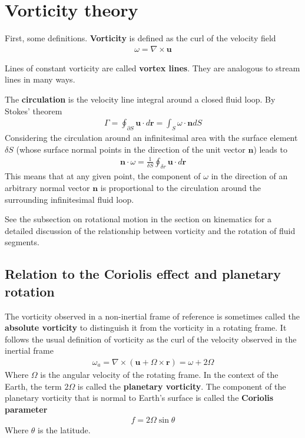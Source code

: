 \documentclass[a4paper, 12pt]{article}
\numberwithin{equation}{subsubsection}
\begin{document}
\newpage
\section{Vorticity theory}
First, some definitions. \textbf{Vorticity} is defined as the curl of the velocity field
\begin{align}
	\omega = \nabla \times \mathbf{u}
\end{align}

Lines of constant vorticity are called \textbf{vortex lines}. They are analogous to stream lines in many ways.

The \textbf{circulation} is the velocity line integral around a closed fluid loop. By Stokes' theorem
\begin{align}
	\Gamma = \oint_{\partial S} \mathbf{u} \cdot d\mathbf{r} = \int_S \omega \cdot \mathbf{n} dS
\end{align}
Considering the circulation around an infinitesimal area with the surface element $\delta S$ (whose surface normal points in the direction of the unit vector $\mathbf{n}$) leads to
\begin{align}
	\mathbf{n} \cdot \omega = \frac{1}{\delta S} \oint_{\delta r} \mathbf{u} \cdot d \mathbf{r}
\end{align}
This means that at any given point, the component of $\omega$ in the direction of an arbitrary normal vector $\mathbf{n}$ is proportional to the circulation around the surrounding infinitesimal fluid loop. 

See the subsection on rotational motion in the section on kinematics for a detailed discussion of the relationship between vorticity and the rotation of fluid segments.

\subsection{Relation to the Coriolis effect and planetary rotation}
The vorticity observed in a non-inertial frame of reference is sometimes called the \textbf{absolute vorticity} to distinguish it from the vorticity in a rotating frame. It follows the usual definition of vorticity as the curl of the velocity observed in the inertial frame
\begin{align}
	\omega_a = \nabla \times (\mathbf{u} + \Omega \times \mathbf{r}) = \omega + 2 \Omega
\end{align}
Where $\Omega$ is the angular velocity of the rotating frame. In the context of the Earth, the term $2 \Omega$ is called the \textbf{planetary vorticity}. The component of the planetary vorticity that is normal to Earth's surface is called the \textbf{Coriolis parameter}
\begin{align}
	f = 2 \Omega \sin \theta
\end{align}
Where $\theta$ is the latitude.
\end{document}
